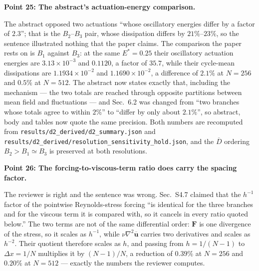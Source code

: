 \documentclass[11pt,a4paper]{article}
\begin{document}
\noindent\textbf{Point 25: The abstract's actuation-energy comparison.}

The abstract opposed two actuations ``whose oscillatory energies differ by a factor
of $2.3$''; that is the $B_2$--$B_3$ pair, whose dissipation differs by
$21\%$--$23\%$, so the sentence illustrated nothing that the paper claims. The
comparison the paper rests on is $B_1$ against $B_3$: at the same
$E^\ast=0.25$ their oscillatory actuation energies are $3.13\times10^{-3}$ and
$0.1120$, a factor of $35.7$, while their cycle-mean dissipations are
$1.1934\times10^{-2}$ and $1.1690\times10^{-2}$, a difference of $2.1\%$ at
$N=256$ and $0.5\%$ at $N=512$. The abstract now states exactly that, including the
mechanism --- the two totals are reached through opposite partitions between mean
field and fluctuations --- and Sec.~6.2 was changed from ``two branches whose totals
agree to within $2\%$'' to ``differ by only about $2.1\%$'', so abstract, body and
tables now quote the same precision. Both numbers are recomputed from
\texttt{results/d2\_derived/d2\_summary.json} and
\texttt{results/d2\_derived/resolution\_sensitivity\_hold.json}, and the
$\overline D$ ordering $B_2>B_1\simeq B_3$ is preserved at both resolutions.

\vspace{1em}

\noindent\textbf{Point 26: The forcing-to-viscous-term ratio does carry the spacing
factor.}

The reviewer is right and the sentence was wrong. Sec.~S4.7 claimed that the $h^{-1}$
factor of the pointwise Reynolds-stress forcing ``is identical for the three branches
and for the viscous term it is compared with, so it cancels in every ratio quoted
below.'' The two terms are not of the same differential order: $\mathbf F$ is one
divergence of the stress, so it scales as $h^{-1}$, while
$\nu\nabla^{2}\overline{\mathbf u}$ carries two derivatives and scales as $h^{-2}$.
Their quotient therefore scales as $h$, and passing from $h=1/(N-1)$ to
$\Delta x=1/N$ multiplies it by $(N-1)/N$, a reduction of $0.39\%$ at $N=256$ and
$0.20\%$ at $N=512$ --- exactly the numbers the reviewer computes.
\end{document}
